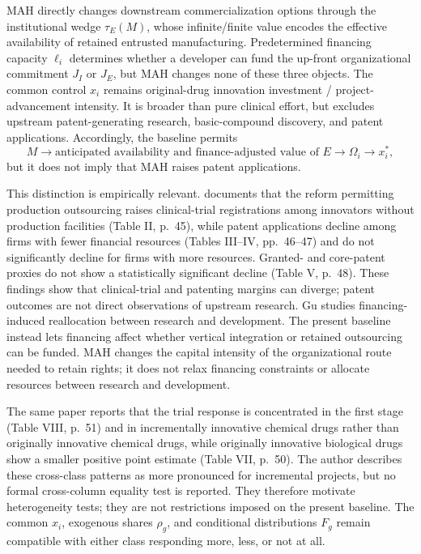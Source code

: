 \documentclass[11pt]{article}
\newcommand{\1}{\mathbf{1}}
\begin{document}
MAH directly changes downstream commercialization options through the
institutional wedge \(\tau_E(M)\), whose infinite/finite value encodes the
effective availability of retained entrusted manufacturing. Predetermined
financing capacity \(\ell_i\) determines whether a developer can fund the
up-front organizational commitment \(J_I\) or \(J_E\), but MAH changes none of
these three objects. The common control \(x_i\) remains original-drug
innovation investment / project-advancement intensity. It is broader than
pure clinical effort, but excludes upstream patent-generating research,
basic-compound discovery, and patent applications. Accordingly, the baseline
permits
\[
  M
  \longrightarrow
  \text{anticipated availability and finance-adjusted value of }E
  \longrightarrow
  \Omega_i
  \longrightarrow
  x_i^*,
\]
but it does not imply that MAH raises patent applications.

This distinction is empirically relevant. \citet{Gu2024} documents that the
reform permitting production outsourcing raises clinical-trial registrations
among innovators without production facilities (Table II, p.~45), while
patent applications decline among firms with fewer financial resources
(Tables III--IV, pp.~46--47) and do not significantly decline for firms with
more resources. Granted- and core-patent proxies do not show a statistically
significant decline (Table V, p.~48). These findings show that clinical-trial
and patenting margins can diverge; patent outcomes are not direct observations
of upstream research. Gu studies financing-induced reallocation between
research and development. The present baseline instead lets financing affect
whether vertical integration or retained outsourcing can be funded. MAH
changes the capital intensity of the organizational route needed to retain
rights; it does not relax financing constraints or allocate resources between
research and development.

The same paper reports that the trial response is concentrated in the first
stage (Table VIII, p.~51) and in incrementally innovative chemical drugs
rather than originally innovative chemical drugs, while originally
innovative biological drugs show a smaller positive point estimate (Table
VII, p.~50). The author describes these cross-class patterns as more
pronounced for incremental projects, but no formal cross-column equality test
is reported. They therefore motivate heterogeneity tests; they are not
restrictions imposed on the present baseline. The common \(x_i\), exogenous
shares \(\rho_g\), and conditional distributions \(F_g\) remain compatible
with either class responding more, less, or not at all.
\end{document}
